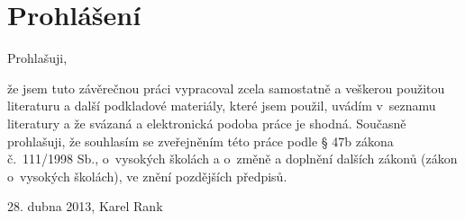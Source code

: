 \section*{Prohlášení}
Prohlašuji,

že jsem tuto závěrečnou práci vypracoval zcela samostatně a veškerou použitou literaturu a další podkladové materiály, které jsem použil, uvádím v~seznamu literatury a že svázaná a elektronická podoba práce je shodná. Současně prohlašuji, že souhlasím se zveřejněním této práce podle § 47b zákona č.~111/1998 Sb., o~vysokých školách a o~změně a doplnění dalších zákonů (zákon o~vysokých školách), ve znění pozdějších předpisů.

\bigskip
\begin{flushright}
28. dubna 2013, Karel Rank
\end{flushright}

\newpage